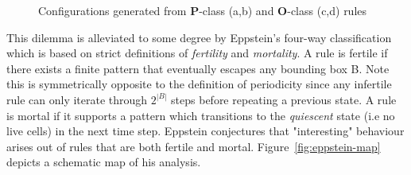 \begin{figure}[!h]
\centering
            \hfill
            \hfill
            \hfill
            \caption{Configurations generated from \textbf{P}-class (a,b) and \textbf{O}-class (c,d) rules \cite{adamatzky2006phenomenology}}
\label{fig:po-class}
\end{figure}

This dilemma is alleviated to some degree by Eppstein's four-way classification\cite{eppstein2010growth} which is based on strict definitions of \textit{fertility} and \textit{mortality}. A rule is fertile if there exists a finite pattern that eventually escapes any bounding box B. Note this is symmetrically opposite to the definition of periodicity since any infertile rule can only iterate through $2^{|B|}$ steps before repeating a previous state. A rule is mortal if it supports a pattern which transitions to the \textit{quiescent} state (i.e no live cells) in the next time step. Eppstein conjectures that "interesting" behaviour arises out of rules that are both fertile and mortal. Figure~\ref{fig:eppstein-map} depicts a schematic map of his analysis.\\

